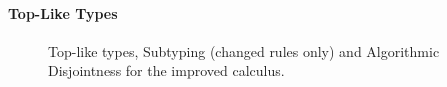\paragraph{Top-Like Types}

\begin{figure}[h]




  \caption{Top-like types, Subtyping (changed rules only) and Algorithmic Disjointness for the improved calculus.}
  \label{fig:tltypesextdis}
\end{figure}

